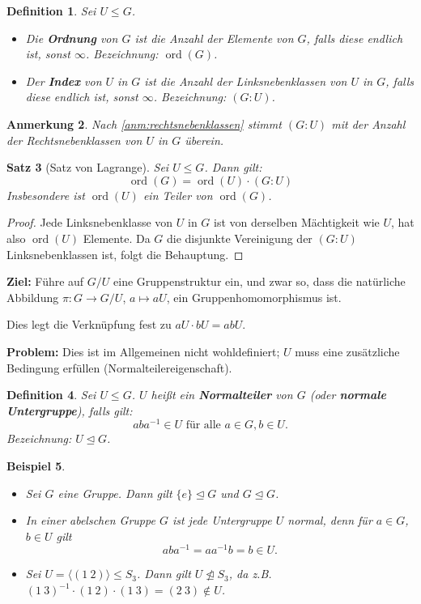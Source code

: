 \documentclass[a4paper, twoside, 11pt, ngerman]{report}
\DeclareMathOperator{\ord}{ord}
\theoremstyle{definistyle}
\newtheorem{satz}{Satz}[section]
\newtheorem{defini}[satz]{Definition}
\newtheorem{anm}[satz]{Anmerkung}
\newtheorem{bsp}[satz]{Beispiel}
\theoremstyle{remark}
\newcommand{\defn}[1]{\textit{\bfseries #1}}
\begin{document}
\begin{defini}\label{def:ordnung_und_index}
Sei $U \leq G$.
\begin{itemize}
    \item Die \defn{Ordnung} von $G$ ist die Anzahl der Elemente von $G$, falls diese endlich ist, sonst $\infty$. Bezeichnung: $\ord(G)$.
    \item Der \defn{Index} von $U$ in $G$ ist die Anzahl der Linksnebenklassen von $U$ in $G$, falls diese endlich ist, sonst $\infty$. Bezeichnung: $(G : U)$.
\end{itemize}
\end{defini}

\begin{anm}\label{anm:index_und_rechtsnebenklassen}
Nach \ref{anm:rechtsnebenklassen} stimmt $(G : U)$ mit der Anzahl der Rechtsnebenklassen von $U$ in $G$ überein.
\end{anm}

\begin{satz}[Satz von Lagrange]\label{satz:lagrange}
Sei $U \leq G$. Dann gilt:
\[
\ord(G) = \ord(U) \cdot (G : U)
\]
Insbesondere ist $\ord(U)$ ein Teiler von $\ord(G)$.
\end{satz}

\begin{proof}
Jede Linksnebenklasse von $U$ in $G$ ist von derselben Mächtigkeit wie $U$, hat also $\ord(U)$ Elemente. Da $G$ die disjunkte Vereinigung der $(G : U)$ Linksnebenklassen ist, folgt die Behauptung.
\end{proof}

\textbf{Ziel:} Führe auf $G/U$ eine Gruppenstruktur ein, und zwar so, dass die natürliche Abbildung $\pi \colon G \to G/U$, $a \mapsto aU$, ein Gruppenhomomorphismus ist.

Dies legt die Verknüpfung fest zu $aU \cdot bU = abU$.

\textbf{Problem:} Dies ist im Allgemeinen nicht wohldefiniert; $U$ muss eine zusätzliche Bedingung erfüllen (Normalteilereigenschaft).

\begin{defini}\label{def:normalteiler}
Sei $U \leq G$. $U$ heißt ein \defn{Normalteiler} von $G$ (oder \defn{normale Untergruppe}), falls gilt:
\[
aba^{-1}\in U \text{ für alle } a\in G, b\in U.
\]
Bezeichnung: $U \trianglelefteq G$.
\end{defini}

\begin{bsp}\label{bsp:normalteiler}
\begin{itemize}
    \item[(a)] Sei $G$ eine Gruppe. Dann gilt $\{e\} \trianglelefteq G$ und $G \trianglelefteq G$.
    \item[(b)] In einer abelschen Gruppe $G$ ist jede Untergruppe $U$ normal, denn für $a\in G$,
    $b\in U$ gilt
    \[
    aba^{-1}=aa^{-1}b=b\in U.
    \]
    \item[(c)] Sei $U = \langle (1 \ 2) \rangle \leq S_3$. Dann gilt $U \ntrianglelefteq S_3$, da z.B. $(1 \ 3)^{-1} \cdot (1 \ 2) \cdot (1 \ 3) = (2 \ 3) \notin U$.
\end{itemize}
\end{bsp}
\end{document}
